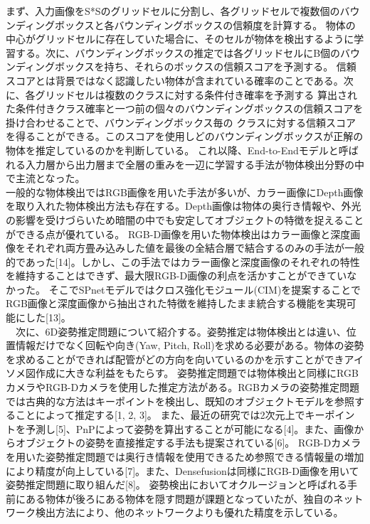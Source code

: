 まず、入力画像をS*Sのグリッドセルに分割し、各グリッドセルで複数個のバウンディングボックスと各バウンディングボックスの信頼度を計算する。
物体の中心がグリッドセルに存在していた場合に、そのセルが物体を検出するように学習する。次に、バウンディングボックスの推定では各グリッドセルにB個のバウンディングボックスを持ち、それらのボックスの信頼スコアを予測する。
信頼スコアとは背景ではなく認識したい物体が含まれている確率のことである。次に、各グリッドセルは複数のクラスに対する条件付き確率を予測する
算出された条件付きクラス確率と一つ前の個々のバウンディングボックスの信頼スコアを掛け合わせることで、バウンディングボックス毎の
クラスに対する信頼スコアを得ることができる。このスコアを使用しどのバウンディングボックスが正解の物体を推定しているのかを判断している。
これ以降、End-to-Endモデルと呼ばれる入力層から出力層まで全層の重みを一辺に学習する手法が物体検出分野の中で主流となった。\\
一般的な物体検出ではRGB画像を用いた手法が多いが、カラー画像にDepth画像を取り入れた物体検出方法も存在する。Depth画像は物体の奥行き情報や、外光の影響を受けづらいため暗闇の中でも安定してオブジェクトの特徴を捉えることができる点が優れている。
RGB-D画像を用いた物体検出はカラー画像と深度画像をそれぞれ両方畳み込みした値を最後の全結合層で結合するのみの手法が一般的であった[14]。しかし、この手法ではカラー画像と深度画像のそれぞれの特性を維持することはできず、最大限RGB-D画像の利点を活かすことができていなかった。
そこでSPnetモデルではクロス強化モジュール(CIM)を提案することでRGB画像と深度画像から抽出された特徴を維持したまま統合する機能を実現可能にした[13]。\\
　次に、6D姿勢推定問題について紹介する。姿勢推定は物体検出とは違い、位置情報だけでなく回転や向き(Yaw, Pitch, Roll)を求める必要がある。物体の姿勢を求めることができれば配管がどの方向を向いているのかを示すことができアイソメ図作成に大きな利益をもたらす。
姿勢推定問題では物体検出と同様にRGBカメラやRGB-Dカメラを使用した推定方法がある。RGBカメラの姿勢推定問題では古典的な方法はキーポイントを検出し、既知のオブジェクトモデルを参照することによって推定する[1, 2, 3]。
また、最近の研究では2次元上でキーポイントを予測し[5]、PnPによって姿勢を算出することが可能になる[4]。また、画像からオブジェクトの姿勢を直接推定する手法も提案されている[6]。
RGB-Dカメラを用いた姿勢推定問題では奥行き情報を使用できるため参照できる情報量の増加により精度が向上している[7]。また、Densefusionは同様にRGB-D画像を用いて姿勢推定問題に取り組んだ[8]。
姿勢検出においてオクルージョンと呼ばれる手前にある物体が後ろにある物体を隠す問題が課題となっていたが、独自のネットワーク検出方法により、他のネットワークよりも優れた精度を示している。

